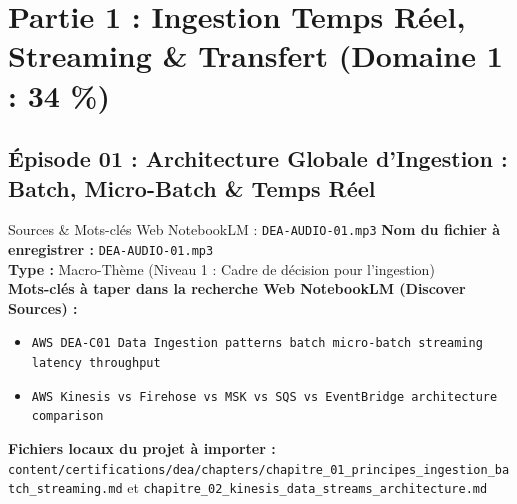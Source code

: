 \documentclass[11pt,a4paper]{article}
\begin{document}
\newpage

\section{Partie 1 : Ingestion Temps Réel, Streaming \& Transfert (Domaine 1 : 34 \%)}

\subsection{Épisode 01 : Architecture Globale d'Ingestion : Batch, Micro-Batch \& Temps Réel}
\begin{sourcebox}{Sources \& Mots-clés Web NotebookLM : \texttt{DEA-AUDIO-01.mp3}}
\textbf{Nom du fichier à enregistrer :} \texttt{DEA-AUDIO-01.mp3}\\
\textbf{Type :} Macro-Thème (Niveau 1 : Cadre de décision pour l'ingestion)\\
\textbf{Mots-clés à taper dans la recherche Web NotebookLM (Discover Sources) :}
\begin{itemize}[noitemsep]
    \item \texttt{AWS DEA-C01 Data Ingestion patterns batch micro-batch streaming latency throughput}
    \item \texttt{AWS Kinesis vs Firehose vs MSK vs SQS vs EventBridge architecture comparison}
\end{itemize}
\textbf{Fichiers locaux du projet à importer :}
\texttt{content/certifications/dea/chapters/chapitre_01_principes_ingestion_batch_streaming.md} et \texttt{chapitre_02_kinesis_data_streams_architecture.md}
\end{sourcebox}
\end{document}
